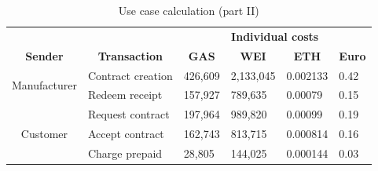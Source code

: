 \documentclass[conference]{IEEEtran}
\begin{document}
\begin{table}[!htbp]
\centering
\caption{Use case calculation (part II)}
\begin{tabular}{clllll}
\textbf{}                     & \multicolumn{1}{c}{\textbf{}}            & \multicolumn{4}{c}{\textbf{Individual costs}}                                                                                              \\
\textbf{Sender}               & \multicolumn{1}{c}{\textbf{Transaction}} & \multicolumn{1}{c}{\textbf{GAS}} & \multicolumn{1}{c}{\textbf{WEI}} & \multicolumn{1}{c}{\textbf{ETH}} & \multicolumn{1}{c}{\textbf{Euro}} \\
\multirow{2}{*}{Manufacturer} & Contract creation                        & 426,609                          & 2,133,045                        & 0.002133                         & 0.42                              \\
                              & Redeem receipt                           & 157,927                          & 789,635                          & 0.00079                          & 0.15                              \\
\multirow{3}{*}{Customer}     & Request contract                         & 197,964                          & 989,820                          & 0.00099                          & 0.19                              \\
                              & Accept contract                          & 162,743                          & 813,715                          & 0.000814                         & 0.16                              \\
                              & Charge prepaid                           & 28,805                           & 144,025                          & 0.000144                         & 0.03                             
\end{tabular}
\end{table}
\end{document}
